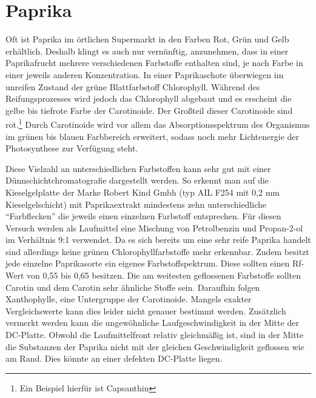 \documentclass[11pt]{scrreprt}
\begin{document}
 

\section{Paprika}
Oft ist Paprika im örtlichen Supermarkt in den Farben Rot, Grün und Gelb erhältlich. Deshalb klingt es auch nur vernünftig, anzunehmen, dass in einer Paprikafrucht mehrere verschiedenen Farbstoffe enthalten sind, je nach Farbe in einer jeweils anderen Konzentration. In einer Paprikaschote überwiegen im unreifen Zustand der grüne Blattfarbstoff Chlorophyll. Während des Reifungsprozesses wird jedoch das Chlorophyll abgebaut und es erscheint die gelbe bis tiefrote Farbe der Carotinoide. Der Großteil dieser Carotinoide sind rot.\footnote{Ein Beispiel hierfür ist Capsanthin}
Durch Carotinoide wird vor allem das Absorptionsspektrum des Organismus im grünen bis blauen Farbbereich erweitert, sodass noch mehr Lichtenergie der Photosynthese zur Verfügung steht.

Diese Vielzahl an unterschiedlichen Farbstoffen kann sehr gut mit einer Dünnschichtchromatografie dargestellt werden. So erkennt man auf die Kieselgelplatte der Marke Robert Kind Gmbh (typ AIL F254 mit 0,2 mm Kieselgelschicht) mit Paprikaextrakt mindestens zehn unterschiedliche \enquote{Farbflecken} die jeweils einen einzelnen Farbstoff entsprechen. Für diesen Versuch werden als Laufmittel eine Mischung von Petrolbenzin und Propan-2-ol im Verhältnis 9:1 verwendet. Da es sich bereits um eine sehr reife Paprika handelt sind allerdings keine grünen Chlorophyllfarbstoffe mehr erkennbar. Zudem besitzt jede einzelne Paprikasorte ein eigenes Farbstoffspektrum.  Diese sollten einen Rf-Wert von 0,55 bis 0,65 besitzen. Die am weitesten geflossenen Farbstoffe sollten Carotin und dem Carotin sehr ähnliche Stoffe sein. Daraufhin folgen Xanthophylle, eine Untergruppe der Carotinoide. 
Mangels exakter Vergleichswerte kann dies leider nicht genauer bestimmt werden. Zusätzlich vermerkt werden kann die ungewöhnliche Laufgeschwindigkeit in der Mitte der DC-Platte. Obwohl die Laufmittelfront relativ gleichmäßig ist, sind in der Mitte die Substanzen der Paprika nicht mit der gleichen Geschwindigkeit geflossen wie am Rand. Dies könnte an einer defekten DC-Platte liegen.


\end{document}
